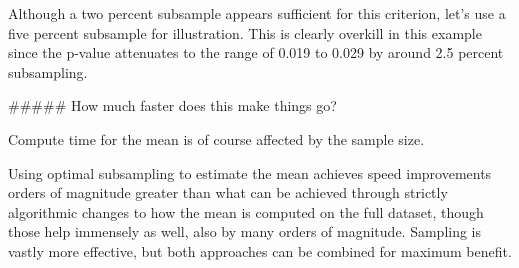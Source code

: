 \documentclass{article}\usepackage[]{graphicx}\usepackage[]{color}
\makeatletter
\newenvironment{kframe}{%
 \def\at@end@of@kframe{}%
 \ifinner\ifhmode%
  \def\at@end@of@kframe{\end{minipage}}%
  \begin{minipage}{\columnwidth}%
 \fi\fi%
 \def\FrameCommand##1{\hskip\@totalleftmargin \hskip-\fboxsep
 \colorbox{shadecolor}{##1}\hskip-\fboxsep
     \hskip-\linewidth \hskip-\@totalleftmargin \hskip\columnwidth}%
 \MakeFramed {\advance\hsize-\width
   \@totalleftmargin\z@ \linewidth\hsize
   \@setminipage}}%
 {\par\unskip\endMakeFramed%
 \at@end@of@kframe}
\newenvironment{knitrout}{}{} %
\makeatother
\begin{document}
Although a two percent subsample appears sufficient for this criterion, let’s use a five percent subsample for illustration.
This is clearly overkill in this example since the p-value attenuates to the range of 0.019 to 0.029 by around 2.5 percent subsampling.

##### How much faster does this make things go?

Compute time for the mean is of course affected by the sample size.

\begin{knitrout}
\color{fgcolor}\begin{kframe}


{\ttfamily\noindent\bfseries\color{errorcolor}{\#\# Error in eval(expr, envir, enclos): object 'd.sub' not found}}

{\ttfamily\noindent\bfseries\color{errorcolor}{\#\# Error in eval(expr, envir, enclos): object 'd.sub' not found}}

{\ttfamily\noindent\bfseries\color{errorcolor}{\#\# Error in eval(expr, envir, enclos): object 'd.sub' not found}}

{\ttfamily\noindent\bfseries\color{errorcolor}{\#\# Error in eval(expr, envir, enclos): object 'd.sub' not found}}\end{kframe}
\end{knitrout}

\begin{knitrout}
\color{fgcolor}\begin{kframe}


{\ttfamily\noindent\bfseries\color{errorcolor}{\#\# Error in microbenchmark(sum(s005pct)/length(s005pct), sum(s010pct)/length(s010pct), : object 's100pct' not found}}

{\ttfamily\noindent\bfseries\color{errorcolor}{\#\# Error in eval(expr, envir, enclos): object 'mb3' not found}}

{\ttfamily\noindent\bfseries\color{errorcolor}{\#\# Error in eval(expr, envir, enclos): object 'no.knit' not found}}

{\ttfamily\noindent\bfseries\color{errorcolor}{\#\# Error in autoplot(mb3): object 'mb3' not found}}

{\ttfamily\noindent\bfseries\color{errorcolor}{\#\# Error in eval(expr, envir, enclos): object 'no.knit' not found}}\end{kframe}
\end{knitrout}

Using optimal subsampling to estimate the mean achieves speed improvements orders of magnitude greater than what can be achieved through strictly algorithmic changes to how the mean is computed on the full dataset,
though those help immensely as well, also by many orders of magnitude.
Sampling is vastly more effective, but both approaches can be combined for maximum benefit.
\end{document}
